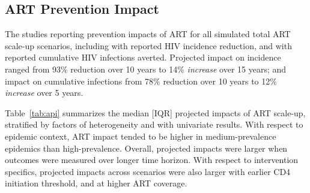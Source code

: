 \subsection{ART Prevention Impact} %
\label{ss:res:api}
The \ni studies reporting prevention impacts of ART for all  %
simulated  total ART scale-up scenarios, including
 with reported HIV incidence reduction, and
 with reported cumulative HIV infections averted.
Projected impact on incidence ranged from %
93\% reduction over 10 years\cite{Granich2009} to
14\% \emph{increase} over 15 years;\cite{Salomon2005}
and impact on cumulative infections from
78\% reduction over 10 years\cite{Abbas2006} to
12\% \emph{increase} over 5 years.\cite{Barnighausen2016}
\par %
Table~\ref{tab:api} summarizes the median [IQR] projected impacts of ART scale-up,  %
stratified by factors of heterogeneity and with univariate results.
With respect to epidemic context, ART impact tended to be higher in medium-prevalence epidemics than high-prevalence.  %
Overall, projected impacts were larger when outcomes were measured over longer time horizon. %
With respect to intervention specifics, projected impacts across scenarios were also larger with earlier CD4 initiation threshold, and at higher ART coverage. %
